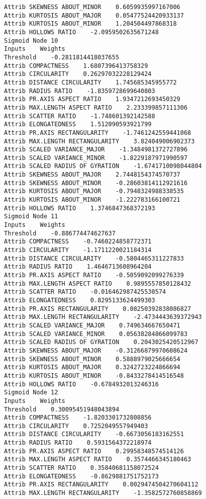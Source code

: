 \documentclass[
	article,			%
	11pt,				%
	oneside,			%
	a4paper,			%
	english,			%
	brazil,				%
	sumario=tradicional
	]{abntex2}
\begin{document}
\begin{lstlisting}
Attrib SKEWNESS ABOUT_MINOR    0.6059935997167006
Attrib KURTOSIS ABOUT_MAJOR    0.05477524420933137
Attrib KURTOSIS ABOUT_MINOR    1.204504497868318
Attrib HOLLOWS RATIO    -2.0959502635671248
Sigmoid Node 10
Inputs    Weights
Threshold    -0.2811814418037655
Attrib COMPACTNESS    1.6807396413758329
Attrib CIRCULARITY    0.26297032228129424
Attrib DISTANCE CIRCULARITY    1.745685345955772
Attrib RADIUS RATIO    -1.8359728699640803
Attrib PR.AXIS ASPECT RATIO    1.9347212693450329
Attrib MAX.LENGTH ASPECT RATIO    2.233399857111306
Attrib SCATTER RATIO    -1.748601392142588
Attrib ELONGATEDNESS    1.512090593921799
Attrib PR.AXIS RECTANGULARITY    -1.7461242559441068
Attrib MAX.LENGTH RECTANGULARITY    3.824049006902373
Attrib SCALED VARIANCE_MAJOR    -1.3484981372727896
Attrib SCALED VARIANCE_MINOR    -1.8229187971990597
Attrib SCALED RADIUS OF GYRATION    -1.6741710098044804
Attrib SKEWNESS ABOUT_MAJOR    2.7448154374570737
Attrib SKEWNESS ABOUT_MINOR    -0.28603814112921616
Attrib KURTOSIS ABOUT_MAJOR    -0.7948324988338535
Attrib KURTOSIS ABOUT_MINOR    -1.222783166100721
Attrib HOLLOWS RATIO    1.3746847368372193
Sigmoid Node 11
Inputs    Weights
Threshold    -0.886774474627637
Attrib COMPACTNESS    -0.7460224858772371
Attrib CIRCULARITY    -1.1711220021184314
Attrib DISTANCE CIRCULARITY    -0.5804465311227833
Attrib RADIUS RATIO    1.4646713608964204
Attrib PR.AXIS ASPECT RATIO    -0.5059092099276339
Attrib MAX.LENGTH ASPECT RATIO    0.9895557850128432
Attrib SCATTER RATIO    -0.016462987425530574
Attrib ELONGATEDNESS    0.8295133624499303
Attrib PR.AXIS RECTANGULARITY    0.08250392838086827
Attrib MAX.LENGTH RECTANGULARITY    -2.4734443639372943
Attrib SCALED VARIANCE_MAJOR    0.749634667650471
Attrib SCALED VARIANCE_MINOR    0.05638284866099783
Attrib SCALED RADIUS OF GYRATION    0.2043025420512967
Attrib SKEWNESS ABOUT_MAJOR    -0.31266879970608624
Attrib SKEWNESS ABOUT_MINOR    0.5888979025666654
Attrib KURTOSIS ABOUT_MAJOR    0.3242723224866694
Attrib KURTOSIS ABOUT_MINOR    -0.8433278414516548
Attrib HOLLOWS RATIO    -0.6784932013246316
Sigmoid Node 12
Inputs    Weights
Threshold    0.30095451948043894
Attrib COMPACTNESS    -1.8203301732808856
Attrib CIRCULARITY    0.7252049557949403
Attrib DISTANCE CIRCULARITY    -0.6673056183162551
Attrib RADIUS RATIO    0.5931564372218974
Attrib PR.AXIS ASPECT RATIO    0.29958348574514126
Attrib MAX.LENGTH ASPECT RATIO    0.3574466345180463
Attrib SCATTER RATIO    0.35840681158072524
Attrib ELONGATEDNESS    -0.8629881751752173
Attrib PR.AXIS RECTANGULARITY    0.0029474504270604112
Attrib MAX.LENGTH RECTANGULARITY    -1.3582572760858869

\end{lstlisting}
\end{document}
